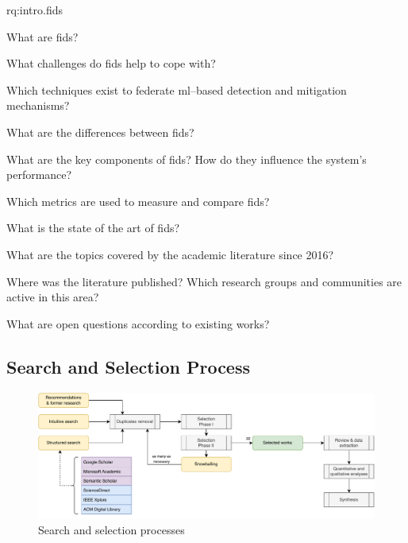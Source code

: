 \begin{subquestions}{rq:intro.fids}
    \item What are \gls{fids}?
    \begin{questions}
        \item What challenges do \gls{fids} help to cope with? \label{rq:sota.challenges}
        \item Which techniques exist to federate \gls{ml}--based detection and mitigation mechanisms? \label{rq:sota.techniques}
    \end{questions}

    \item What are the differences between \gls{fids}?
    \begin{questions}
        \item What are the key components of \gls{fids}? How do they influence the system's performance? \label{rq:sota.components}
        \item Which metrics are used to measure and compare \gls{fids}? \label{rq:sota.metrics}
    \end{questions}

    \item What is the state of the art of \gls{fids}?
    \begin{questions}
        \item What are the topics covered by the academic literature since 2016? \label{rq:sota.literature}
        \item Where was the literature published? Which research groups and communities are active in this area? \label{rq:sota.wherewho}
        \item What are open questions according to existing works? \label{rq:sota.open}
    \end{questions}
\end{subquestions}


\subsection{Search and Selection Process\label{sec:sota.methodo.search}}

\begin{figure}
  \centering
  \includegraphics[width=\textwidth]{figures/methodo-survey.drawio.pdf}
  \caption{Search and selection processes}
  \label{fig:sota.methodo.original}
\end{figure}

